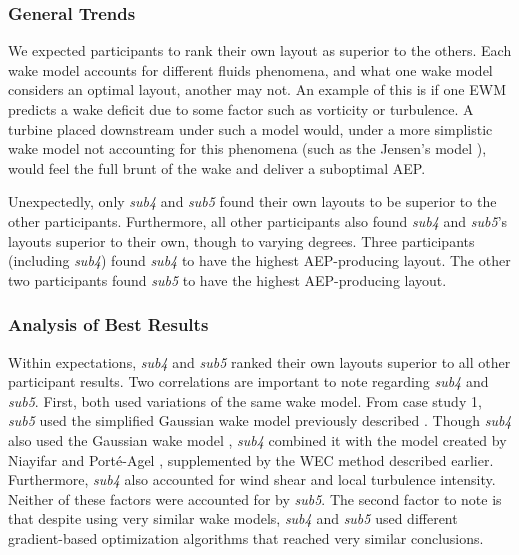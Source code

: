 \subsubsection{General Trends}

	We expected participants to rank their own layout as superior to the others.
	Each wake model accounts for different fluids phenomena, and what one wake model considers an optimal layout, another may not.
	An example of this is if one EWM predicts a wake deficit due to some factor such as vorticity or turbulence.
	A turbine placed downstream under such a model would, under a more simplistic wake model not accounting for this phenomena (such as the Jensen's model \cite{Jensen1983}), would feel the full brunt of the wake and deliver a suboptimal AEP.

	Unexpectedly, only \textit{sub4} and \textit{sub5} found their own layouts to be superior to the other participants.
	Furthermore, all other participants also found \textit{sub4} and \textit{sub5}'s layouts superior to their own, though to varying degrees.
	Three participants (including \textit{sub4}) found \textit{sub4} to have the highest AEP-producing layout.
	The other two participants found \textit{sub5} to have the highest AEP-producing layout.

\subsubsection{Analysis of Best Results}

	Within expectations, \textit{sub4} and \textit{sub5} ranked their own layouts superior to all other participant results.
	Two correlations are important to note regarding \textit{sub4} and \textit{sub5}.
	First, both used variations of the same wake model.
	From case study 1, \textit{sub5} used the simplified Gaussian wake model previously described \cite{Bastankhah2016,ThomasNing2018}.
	Though \textit{sub4} also used the Gaussian wake model \cite{Bastankhah2016}, \textit{sub4} combined it with the model created by Niayifar and Porté-Agel \cite{Niayifar2016}, supplemented by the WEC method described earlier.
	Furthermore, \textit{sub4} also accounted for wind shear and local turbulence intensity.
	Neither of these factors were accounted for by \textit{sub5}.
	The second factor to note is that despite using very similar wake models, \textit{sub4} and \textit{sub5} used different gradient-based optimization algorithms that reached very similar conclusions.

